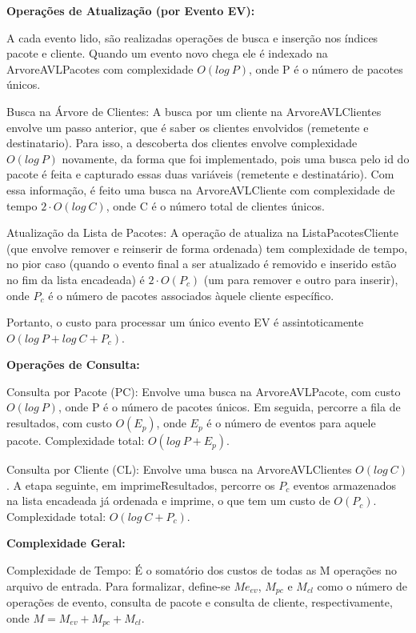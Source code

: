\documentclass[
  12pt,
]{article}
\begin{document}
\textbf{Operações de Atualização (por Evento EV):}

A cada evento lido, são realizadas operações de busca e inserção nos
índices pacote e cliente. Quando um evento novo chega ele é indexado na
ArvoreAVLPacotes com complexidade \(O (log\ P)\), onde P é o número de
pacotes únicos.

Busca na Árvore de Clientes: A busca por um cliente na ArvoreAVLClientes
envolve um passo anterior, que é saber os clientes envolvidos (remetente
e destinatario). Para isso, a descoberta dos clientes envolve
complexidade \(O (log\ P)\) novamente, da forma que foi implementado,
pois uma busca pelo id do pacote é feita e capturado essas duas
variáveis (remetente e destinatário). Com essa informação, é feito uma
busca na ArvoreAVLCliente com complexidade de tempo
\(2\cdot O (log\ C)\), onde C é o número total de clientes únicos.

Atualização da Lista de Pacotes: A operação de atualiza na
ListaPacotesCliente (que envolve remover e reinserir de forma ordenada)
tem complexidade de tempo, no pior caso (quando o evento final a ser
atualizado é removido e inserido estão no fim da lista encadeada) é
\(2 \cdot O(P_c)\) (um para remover e outro para inserir), onde \(P_c\)
é o número de pacotes associados àquele cliente específico.

Portanto, o custo para processar um único evento EV é assintoticamente
\(O(log\ P + log\ C+ P_c)\).

\textbf{Operações de Consulta:}

Consulta por Pacote (PC): Envolve uma busca na ArvoreAVLPacote, com
custo \(O (log\ P)\), onde P é o número de pacotes únicos. Em seguida,
percorre a fila de resultados, com custo \(O(E_p)\), onde \(E_p\) é o
número de eventos para aquele pacote. Complexidade total:
\(O(log\ P + E_p)\).

Consulta por Cliente (CL): Envolve uma busca na ArvoreAVLClientes
\(O(log\ C)\). A etapa seguinte, em imprimeResultados, percorre os
\(P_c\) eventos armazenados na lista encadeada já ordenada e imprime, o
que tem um custo de \(O(P_c)\). Complexidade total: \(O(log\ C + P_c)\).

\textbf{Complexidade Geral:}

Complexidade de Tempo: É o somatório dos custos de todas as M operações
no arquivo de entrada. Para formalizar, define-se \(Me_{ev}\),
\(M_{pc}\) e \(M_{cl}\) como o número de operações de evento, consulta
de pacote e consulta de cliente, respectivamente, onde
\(M = M_{ev} + M_{pc} + M_{cl}\).
\end{document}
